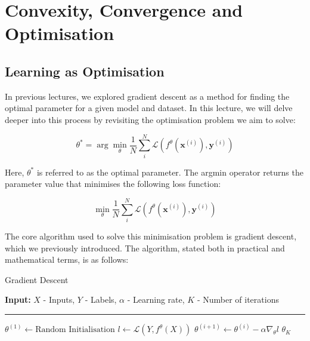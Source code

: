 \chapter{Convexity, Convergence and Optimisation}




\section{Learning as Optimisation}

In previous lectures, we explored gradient descent as a method for finding the optimal parameter for a given model and dataset. In this lecture, we will delve deeper into this process by revisiting the optimisation problem we aim to solve:

\[
    \theta^* = \arg\min_{\theta} \frac{1}{N} \sum_{i}^N \mathcal{L}(f^\theta(\bm{x}^{(i)}), \bm{y}^{(i)})
\]

Here, $\theta^*$ is referred to as the optimal parameter. The argmin operator returns the parameter value that minimises the following loss function:

\[
    \min_{\theta} \frac{1}{N} \sum_{i}^N \mathcal{L}(f^\theta(\bm{x}^{(i)}), \bm{y}^{(i)})
\]

The core algorithm used to solve this minimisation problem is gradient descent, which we previously introduced. The algorithm, stated both in practical and mathematical terms, is as follows:



\begin{algorithm}
    \caption{Gradient Descent}\label{alg:gradient_descent}
    \textbf{Input: } $X$ - Inputs, $Y$ - Labels, $\alpha$ - Learning rate, $K$ - Number of iterations
    \vspace{-8pt} %
    \par\noindent\rule{\linewidth}{0.5pt}
    \vspace{-15pt} %
    \begin{algorithmic}[1]
        \State $\theta^{(1)} \gets \text{Random Initialisation}$
        \State $l \gets \mathcal{L}(Y, f^\theta(X))$
        \State $\theta^{(i+1)} \gets \theta^{(i)} - \alpha \nabla_{\theta} l$
        \EndFor
        \State \Return $\theta_K$
    \end{algorithmic}
\end{algorithm}


